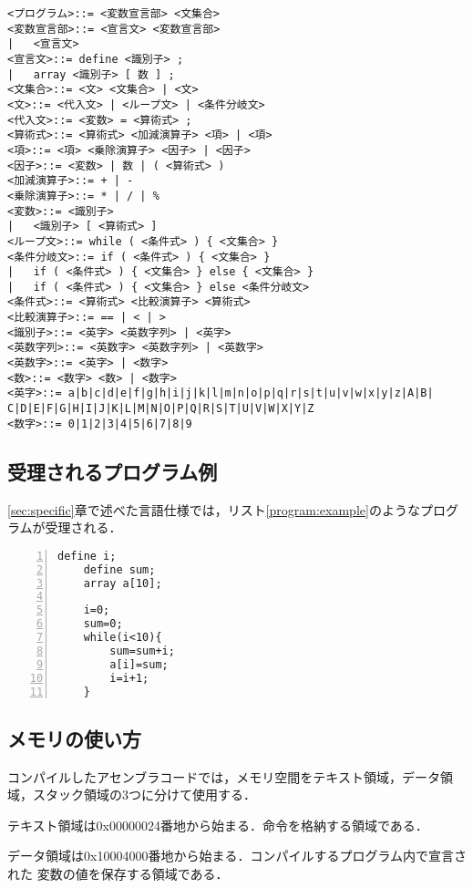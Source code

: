 \documentclass[11pt]{jarticle}
\begin{document}
\begin{lstlisting}[label=list:specific, caption=言語仕様]
<プログラム>::= <変数宣言部> <文集合> 
<変数宣言部>::= <宣言文> <変数宣言部> 
|   <宣言文> 
<宣言文>::= define <識別子> ; 
|   array <識別子> [ 数 ] ; 
<文集合>::= <文> <文集合> | <文> 
<文>::= <代入文> | <ループ文> | <条件分岐文> 
<代入文>::= <変数> = <算術式> ; 
<算術式>::= <算術式> <加減演算子> <項> | <項> 
<項>::= <項> <乗除演算子> <因子> | <因子> 
<因子>::= <変数> | 数 | ( <算術式> ) 
<加減演算子>::= + | - 
<乗除演算子>::= * | / | %
<変数>::= <識別子> 
|   <識別子> [ <算術式> ]
<ループ文>::= while ( <条件式> ) { <文集合> } 
<条件分岐文>::= if ( <条件式> ) { <文集合> } 
|   if ( <条件式> ) { <文集合> } else { <文集合> }
|   if ( <条件式> ) { <文集合> } else <条件分岐文>
<条件式>::= <算術式> <比較演算子> <算術式>
<比較演算子>::= == | < | >
<識別子>::= <英字> <英数字列> | <英字>
<英数字列>::= <英数字> <英数字列> | <英数字>
<英数字>::= <英字> | <数字>
<数>::= <数字> <数> | <数字>
<英字>::= a|b|c|d|e|f|g|h|i|j|k|l|m|n|o|p|q|r|s|t|u|v|w|x|y|z|A|B|
C|D|E|F|G|H|I|J|K|L|M|N|O|P|Q|R|S|T|U|V|W|X|Y|Z
<数字>::= 0|1|2|3|4|5|6|7|8|9
\end{lstlisting}

\subsection{受理されるプログラム例}

\ref{sec:specific}章で述べた言語仕様では，リスト\ref{program:example}のようなプログラムが受理される．

\begin{lstlisting}[caption=受理されるプログラムの例, label=program:example, numbers=left]
    define i;
    define sum;
    array a[10];

    i=0;
    sum=0;
    while(i<10){
        sum=sum+i;
        a[i]=sum;
        i=i+1;
    }
\end{lstlisting}

\subsection{メモリの使い方}

コンパイルしたアセンブラコードでは，メモリ空間をテキスト領域，データ領域，スタック領域の3つに分けて使用する．

テキスト領域は0x00000024番地から始まる．命令を格納する領域である．

データ領域は0x10004000番地から始まる．コンパイルするプログラム内で宣言された
変数の値を保存する領域である．
\end{document}
